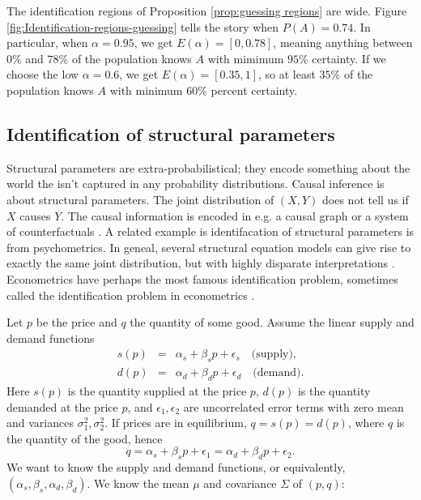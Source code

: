The identification regions of Proposition \ref{prop:guessing regions}
are wide. Figure \ref{fig:Identification-regions-guessing} tells
the story when $P(A)=0.74$. In particular, when $\alpha=0.95$, we
get $E(\alpha)=[0,0.78]$, meaning anything between $0\%$ and $78\%$
of the population knows $A$ with mimimum $95\%$ certainty. If we
choose the low $\alpha=0.6$, we get $E(\alpha)=[0.35,1]$, so at
least $35\%$ of the population knows $A$ with minimum $60\%$ percent
certainty. 

\subsection{Identification of structural parameters}

Structural parameters are extra-probabilistical; they encode something
about the world the isn't captured in any probability distributions.
Causal inference is about structural parameters. The joint distribution
of $(X,Y)$ does not tell us if $X$ causes $Y$. The causal information
is encoded in e.g. a causal graph \parencite{Pearl2009-zf} or a system
of counterfactuals \parencite[Chapter 4]{Pearl2016-tc}. A related example
is identifacation of structural parameters is from psychometrics.
In geneal, several structural equation models can give rise to exactly
the same joint distribution, but with highly disparate interpretations
\parencite{Raykov2001-ap}. Econometrics have perhaps the most famous
identification problem, sometimes called the identification problem
in econometrics \parencite{Manski1999-ab}.
\begin{example}
 Let $p$ be the price and $q$ the quantity of some good. Assume
the linear supply and demand functions
\begin{eqnarray*}
s(p) & = & \alpha_{s}+\beta_{s}p+\epsilon_{s}\quad\textrm{(supply)},\\
d(p) & = & \alpha_{d}+\beta_{d}p+\epsilon_{d}\quad\textrm{(demand).}
\end{eqnarray*}
Here $s(p)$ is the quantity supplied at the price $p$, $d(p)$ is
the quantity demanded at the price $p$, and $\epsilon_{1},\epsilon_{2}$
are uncorrelated error terms with zero mean and variances $\sigma_{1}^{2},\sigma_{2}^{2}$.
If prices are in equilibrium, $q=s(p)=d(p)$, where $q$ is the quantity
of the good, hence
\[
q=\alpha_{s}+\beta_{s}p+\epsilon_{1}=\alpha_{d}+\beta_{d}p+\epsilon_{2}.
\]
We want to know the supply and demand functions, or equivalently,
$(\alpha_{s},\beta_{s},\alpha_{d},\beta_{d})$. We know the mean $\mu$
and covariance $\Sigma$ of $(p,q)$:
\end{example}

